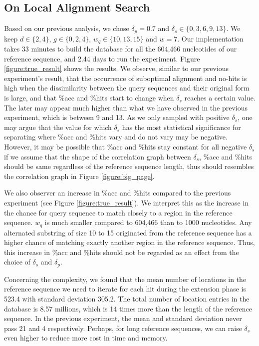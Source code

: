 \documentclass{article}
\begin{document}
\subsection{On Local Alignment Search}

Based on our previous analysis, we chose $\delta_p = 0.7$ and $\delta_s \in \{0, 3, 6, 9, 13\}$. We keep $d \in \{2, 4\}$, $g \in \{0, 2, 4\}$, $w_q \in \{10, 13, 15\}$ and $w=7$. Our implementation takes 33 minutes to build the database for all the 604,466 nucleotides of our reference sequence, and 2.44 days to run the experiment. Figure \ref{figure:true_result} shows the results. We observe, similar to our previous experiment's result, that the occurrence of suboptimal alignment and no-hits is high when the dissimilarity between the query sequences and their original form is large, and that \%acc and \%hits start to change when $\delta_s$ reaches a certain value. The later may appear much higher than what we have observed in the previous experiment, which is between 9 and 13. As we only sampled with positive $\delta_s$, one may argue that the value for which $\delta_s$ has the most statistical significance for separating where \%acc and \%hits vary and do not vary may be negative. However, it may be possible that \%acc and \%hits stay constant for all negative $\delta_s$ if we assume that the shape of the correlation graph between $\delta_s$, \%acc and \%hits should be same regardless of the reference sequence length, thus should resembles the correlation graph in Figure \ref{figure:big_page}.

We also observer an increase in \%acc and \%hits compared to the previous experiment (see Figure \ref{figure:true_result}). We interpret this as the increase in the chance for query sequence to match closely to a region in the reference sequence. $w_q$ is much smaller compared to 604,466 than to 1000 nucleotides. Any alternated substring of size 10 to 15 originated from the reference sequence has a higher chance of matching exactly another region in the reference sequence. Thus, this increase in \%acc and \%hits should not be regarded as an effect from the choice of $\delta_s$ and $\delta_p$. 

Concerning the complexity, we found that the mean number of locations in the reference sequence we need to iterate for each hit during the extension phase is 523.4 with standard deviation 305.2. The total number of location entries in the database is 8.57 millions, which is 14 times more than the length of the reference sequence. In the previous experiment, the mean and standard deviation never pass 21 and 4 respectively. Perhaps, for long reference sequences, we can raise $\delta_s$ even higher to reduce more cost in time and memory.
\end{document}
